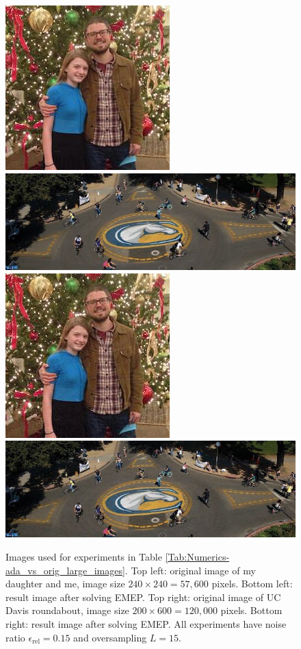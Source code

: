 \begin{figure}[H]
\centering
	\includegraphics[scale=0.4166666666]{jul_and_me_orig}
		\hspace{0.1cm}
		\includegraphics[scale=0.5]{UCD_orig}
		\vspace{0.3cm} \hspace{0.02cm}
		\\
	\includegraphics[scale=0.4166666666]{jul_and_me_L_15_ada40}	
		\hspace{0.1cm}
		\includegraphics[scale=0.5]{UCD_L_15_ada40} 
		\vspace{0.0cm}
	\caption{
Images used for experiments in Table \ref{Tab:Numerics-ada_vs_orig_large_images}.
Top left: original image of my daughter and me, image size $240 \times 240 = 57,600$ pixels.
Bottom left: result image after solving EMEP.
Top right: original image of UC Davis roundabout, image size $200 \times 600 = 120,000$ pixels.
Bottom right: result image after solving EMEP.
All experiments have noise ratio $\epsilon_\text{rel} = 0.15$ and oversampling $L = 15$.
	}
\label{Fig:Numerics-large_images}
\end{figure}
